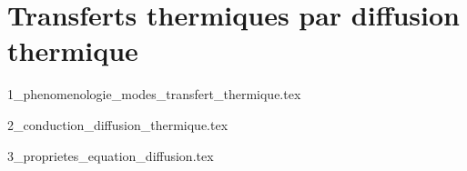 \chapter{Transferts thermiques par diffusion thermique}

\minitoc 

{1_phenomenologie_modes_transfert_thermique.tex}

{2_conduction_diffusion_thermique.tex}

{3_proprietes_equation_diffusion.tex}